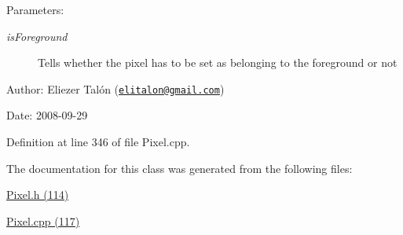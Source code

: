 \begin{Desc}
\item[Parameters:]
\begin{description}
\item[{\em isForeground}]Tells whether the pixel has to be set as belonging to the foreground or not\end{description}
\end{Desc}
\begin{Desc}
\item[Author:]Eliezer Talón (\href{mailto:elitalon@gmail.com}{\tt elitalon@gmail.com}) \end{Desc}
\begin{Desc}
\item[Date:]2008-09-29 \end{Desc}


Definition at line 346 of file Pixel.cpp.

The documentation for this class was generated from the following files:\begin{CompactItemize}
\item 
\hyperlink{_pixel_8h}{Pixel.h (114)}\item 
\hyperlink{_pixel_8cpp}{Pixel.cpp (117)}\end{CompactItemize}
